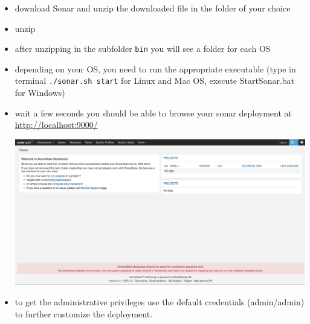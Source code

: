 \documentclass{article}
\begin{document}
\begin{itemize}
\item download Sonar
  \href{https://sonarsource.bintray.com/Distribution/sonarqube/sonarqube-6.3.zip}{}
  and unzip the downloaded file in the folder of your choice
\item unzip
\item after unzipping in the subfolder \texttt{bin} you will see a folder for each OS
\item depending on your OS, you need to run the appropriate executable
  (type in terminal \texttt{./sonar.sh start} for Linux and Mac OS,
  execute StartSonar.bat for Windows)
\item wait a few seconds you should be able to browse your sonar deployment at
  \url{http://localhost:9000/}
\begin{center}
\includegraphics[scale=0.3]{figures/ss0.png}
\end{center}
\item to get the administrative privileges use the default credentials
  (admin/admin) to further customize the deployment.


\end{itemize}
\end{document}
